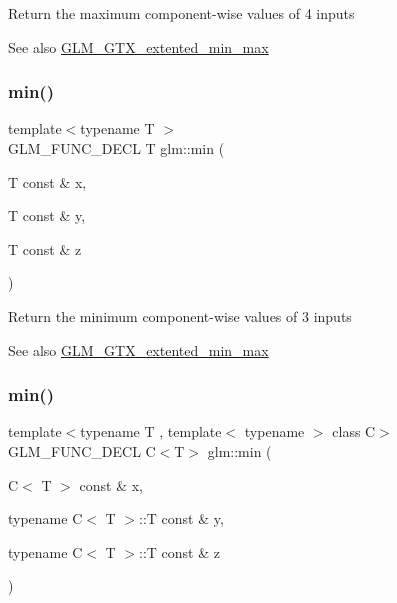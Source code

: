 Return the maximum component-\/wise values of 4 inputs \begin{DoxySeeAlso}{See also}
\hyperlink{group__gtx__extented__min__max}{G\+L\+M\+\_\+\+G\+T\+X\+\_\+extented\+\_\+min\+\_\+max} 
\end{DoxySeeAlso}
\mbox{\label{group__gtx__extented__min__max_ga713d3f9b3e76312c0d314e0c8611a6a6}} 
\subsubsection{\texorpdfstring{min()}{min()}\hspace{0.1cm}{\footnotesize\ttfamily [1/6]}}
{\footnotesize\ttfamily template$<$typename T $>$ \\
G\+L\+M\+\_\+\+F\+U\+N\+C\+\_\+\+D\+E\+CL T glm\+::min (\begin{DoxyParamCaption}\item[{T const \&}]{x,  }\item[{T const \&}]{y,  }\item[{T const \&}]{z }\end{DoxyParamCaption})}

Return the minimum component-\/wise values of 3 inputs \begin{DoxySeeAlso}{See also}
\hyperlink{group__gtx__extented__min__max}{G\+L\+M\+\_\+\+G\+T\+X\+\_\+extented\+\_\+min\+\_\+max} 
\end{DoxySeeAlso}
\mbox{\label{group__gtx__extented__min__max_ga74d1a96e7cdbac40f6d35142d3bcbbd4}} 
\subsubsection{\texorpdfstring{min()}{min()}\hspace{0.1cm}{\footnotesize\ttfamily [2/6]}}
{\footnotesize\ttfamily template$<$typename T , template$<$ typename $>$ class C$>$ \\
G\+L\+M\+\_\+\+F\+U\+N\+C\+\_\+\+D\+E\+CL C$<$T$>$ glm\+::min (\begin{DoxyParamCaption}\item[{C$<$ T $>$ const \&}]{x,  }\item[{typename C$<$ T $>$\+::T const \&}]{y,  }\item[{typename C$<$ T $>$\+::T const \&}]{z }\end{DoxyParamCaption})}

